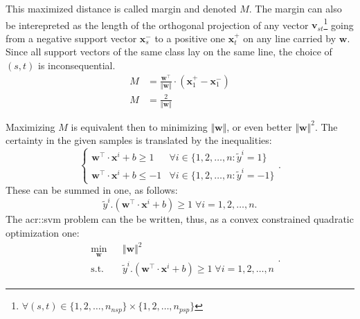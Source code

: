                 This maximized distance is called margin and denoted $M$.
                The margin can also be interepreted as the length of the orthogonal projection of any vector $\bm{v}_{st}$\footnote{$\forall (s, t) \in \{1,2,\dots,n_{nsp}\} \times \{1,2,\dots,n_{psp}\}$} going from a negative support vector $\bm{x}^-_s$ to a positive one $\bm{x}^+_t$ on any line carried by $\bm{w}$.
                Since all support vectors of the same class lay on the same line, the choice of $(s,t)$ is inconsequential.
                \begin{align}
                    M &= \frac{\bm{w}^\intercal}{\Vert\bm{w}\Vert} \cdot (\bm{x}^+_1 - \bm{x}^-_1) \nonumber \\
                    M &= \frac{2}{\Vert\bm{w}\Vert}
                \end{align}

                Maximizing $M$ is equivalent then to minimizing $\Vert\bm{w}\Vert$, or even better $\Vert\bm{w}\Vert^2$.
                The certainty in the given samples is translated by the inequalities:
                \begin{equation*}
                    \begin{cases}
                        \bm{w}^\intercal\cdot\bm{x}^i + b \geq 1 & \forall i \in \{1, 2, \dots, n: \tilde{y}^i = 1\}\\
                        \bm{w}^\intercal\cdot\bm{x}^i + b \leq -1 & \forall i \in \{1, 2, \dots, n: \tilde{y}^i = -1\}
                    \end{cases}.
                \end{equation*}
                These can be summed in one, as follows:
                \begin{equation}
                    \label{eq::hard_margin}
                    \tilde{y}^i.(\bm{w}^\intercal\cdot\bm{x}^i + b) \geq 1 \; \forall i = 1, 2, \dots, n.
                \end{equation}
                The \gls{acr::svm} problem can the be written, thus, as a convex constrained quadratic optimization one:
                \begin{equation}
                    \label{eq::hard_svm_primal}
                    \begin{aligned}
                        & \min_{\bm{w}}
                        & & {\Vert \bm{w} \Vert}^2 \\
                        & \text{s.t.}
                        & & \tilde{y}^i.(\bm{w}^\intercal\cdot\bm{x}^i + b) \geq 1 \; \forall i = 1, 2, \dots, n
                    \end{aligned}.
                \end{equation}

